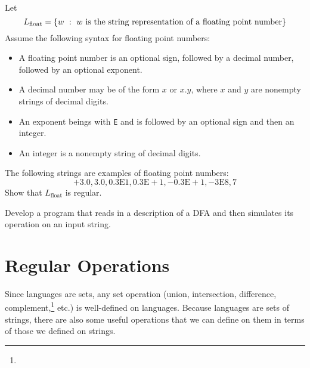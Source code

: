 \documentclass[twoside,letterpaper,openany]{book}
\begin{document}
\begin{exer}\label{exer:floatingpoint}
~\\Let 
\[L_{\mathrm{float}} = \left\lbrace w\ :\ w~\textrm{is the string representation of a floating point number} \right\rbrace\]
Assume the following syntax for floating point numbers:
\begin{itemize}
\item A floating point number is an optional sign, followed by a decimal number, followed by an optional exponent.
\item A decimal number may be of the form $x$ or $x.y$, where $x$ and $y$ are nonempty strings of decimal digits.
\item An exponent beings with \texttt{E} and is followed by an optional sign and then an integer.
\item An integer is a nonempty string of decimal digits.
\end{itemize}
The following strings are examples of floating point numbers:
\[\mathrm{+3.0, 3.0, 0.3E1, 0.3E+1, -0.3E+1, -3E8, 7}\]
Show that $L_{\mathrm{float}}$ is regular.
\end{exer}


\begin{progexer}\happymac
Develop a program that reads in a description of a DFA and then simulates its operation on an input string.
\end{progexer}





\clearpage
\section{Regular Operations}

\begin{discussion}
Since languages are sets, any set operation (union, intersection, difference, complement,\footnote{} etc.) is well-defined on languages. Because languages are sets of strings, there are also some useful operations that we can define on them in terms of those we defined on strings.
\end{discussion}
\end{document}
